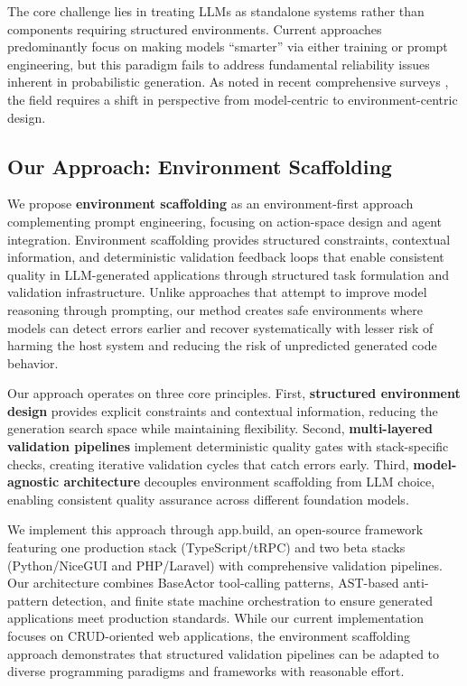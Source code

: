 \documentclass{article}
\begin{document}
The core challenge lies in treating LLMs as standalone systems rather than components requiring structured environments. Current approaches predominantly focus on making models ``smarter'' via either training or prompt engineering, but this paradigm fails to address fundamental reliability issues inherent in probabilistic generation. As noted in recent comprehensive surveys \citep{jiang2024survey,paul2024benchmarks}, the field requires a shift in perspective from model-centric to environment-centric design.

\subsection{Our Approach: Environment Scaffolding}

We propose \textbf{environment scaffolding} as an environment-first approach complementing prompt engineering, focusing on action-space design and agent integration. Environment scaffolding provides structured constraints, contextual information, and deterministic validation feedback loops that enable consistent quality in LLM-generated applications through structured task formulation and validation infrastructure. Unlike approaches that attempt to improve model reasoning through prompting, our method creates safe environments where models can detect errors earlier and recover systematically with lesser risk of harming the host system and reducing the risk of unpredicted generated code behavior.

Our approach operates on three core principles. First, \textbf{structured environment design} provides explicit constraints and contextual information, reducing the generation search space while maintaining flexibility. Second, \textbf{multi-layered validation pipelines} implement deterministic quality gates with stack-specific checks, creating iterative validation cycles that catch errors early. Third, \textbf{model-agnostic architecture} decouples environment scaffolding from LLM choice, enabling consistent quality assurance across different foundation models.

We implement this approach through app.build, an open-source framework featuring one production stack (TypeScript/tRPC) and two beta stacks (Python/NiceGUI and PHP/Laravel) with comprehensive validation pipelines. Our architecture combines BaseActor tool-calling patterns, AST-based anti-pattern detection, and finite state machine orchestration to ensure generated applications meet production standards. While our current implementation focuses on CRUD-oriented web applications, the environment scaffolding approach demonstrates that structured validation pipelines can be adapted to diverse programming paradigms and frameworks with reasonable effort.
\end{document}
